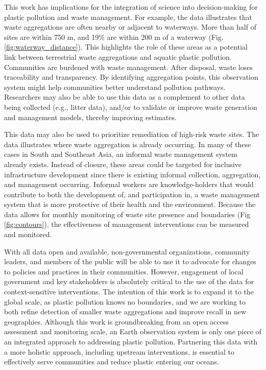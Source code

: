 \documentclass[10pt,letterpaper]{article}
\begin{document}
This work has implications for the integration of science into decision-making for plastic pollution and waste management. For example, the data illustrates that waste aggregations are often nearby or adjacent to waterways. More than half of sites are within 750 m, and 19\% are within 200 m of a waterway (Fig. \ref{fig:waterway_distance}). This highlights the role of these areas as a potential link between terrestrial waste aggregations and aquatic plastic pollution. Communities are burdened with waste management. After disposal, waste loses traceability and transparency. By identifying aggregation points, this observation system might help communities better understand pollution pathways. Researchers may also be able to use this data as a complement to other data being collected (e.g., litter data), and/or to validate or improve waste generation and management models, thereby improving estimates.

This data may also be used to prioritize remediation of high-risk waste sites. The data illustrates where waste aggregation is already occurring. In many of these cases in South and Southeast Asia, an informal waste management system already exists. Instead of closure, these areas could be targeted for inclusive infrastructure development since there is existing informal collection, aggregation, and management occurring. Informal workers are knowledge-holders that would contribute to both the development of, and participation in, a waste management system that is more protective of their health and the environment. Because the data allows for monthly monitoring of waste site presence and boundaries (Fig \ref{fig:contours}), the effectiveness of management interventions can be measured and monitored.

With all data open and available, non-governmental organizations, community leaders, and members of the public will be able to use it to advocate for changes to policies and practices in their communities. However, engagement of local government and key stakeholders is absolutely critical to the use of the data for context-sensitive interventions. The intention of this work is to expand it to the global scale, as plastic pollution knows no boundaries, and we are working to both refine detection of smaller waste aggregations and improve recall in new geographies. Although this work is groundbreaking from an open access assessment and monitoring scale, an Earth observation system is only one piece of an integrated approach to addressing plastic pollution. Partnering this data with a more holistic approach, including upstream interventions, is essential to effectively serve communities and reduce plastic entering our oceans.
\end{document}
